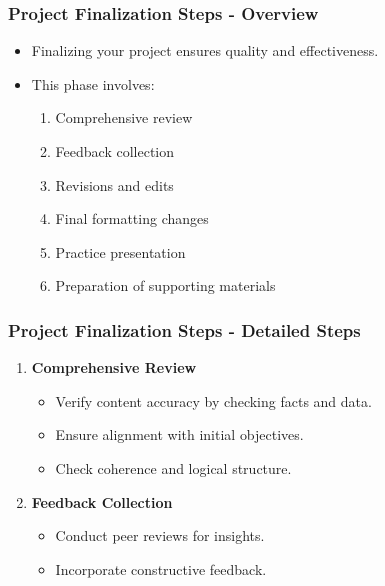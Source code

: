 \documentclass{beamer}
\begin{document}
\begin{frame}[fragile]
    \frametitle{Project Finalization Steps - Overview}
    \begin{itemize}
        \item Finalizing your project ensures quality and effectiveness.
        \item This phase involves:
        \begin{enumerate}
            \item Comprehensive review
            \item Feedback collection
            \item Revisions and edits
            \item Final formatting changes
            \item Practice presentation
            \item Preparation of supporting materials
        \end{enumerate}
    \end{itemize}
\end{frame}

\begin{frame}[fragile]
    \frametitle{Project Finalization Steps - Detailed Steps}
    \begin{enumerate}
        \item \textbf{Comprehensive Review}
        \begin{itemize}
            \item Verify content accuracy by checking facts and data.
            \item Ensure alignment with initial objectives.
            \item Check coherence and logical structure.
        \end{itemize}
        
        \item \textbf{Feedback Collection}
        \begin{itemize}
            \item Conduct peer reviews for insights.
            \item Incorporate constructive feedback.
        \end{itemize}
    \end{enumerate}
\end{frame}
\end{document}
